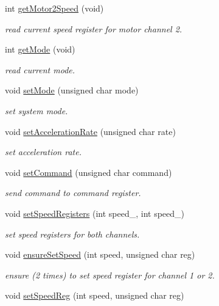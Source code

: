 \begin{DoxyCompactItemize}
int \hyperlink{classMd25_a2ff03a376f76d6e0132a722fe77acfb7}{get\+Motor2\+Speed} (void)
\begin{DoxyCompactList}\small\item\em read current speed register for motor channel 2. \end{DoxyCompactList}\item 
int \hyperlink{classMd25_a8bd5ce341e890968e63be0f8809d9f5b}{get\+Mode} (void)
\begin{DoxyCompactList}\small\item\em read current mode. \end{DoxyCompactList}\item 
void \hyperlink{classMd25_a4f1c692574af8ecc2b7a3d3a35a26d51}{set\+Mode} (unsigned char mode)
\begin{DoxyCompactList}\small\item\em set system mode. \end{DoxyCompactList}\item 
void \hyperlink{classMd25_a867fba5da9401423ee3dabfc18bbc1ed}{set\+Acceleration\+Rate} (unsigned char rate)
\begin{DoxyCompactList}\small\item\em set acceleration rate. \end{DoxyCompactList}\item 
void \hyperlink{classMd25_a470d70216b3a09da61e59a2074619ee2}{set\+Command} (unsigned char command)
\begin{DoxyCompactList}\small\item\em send command to command register. \end{DoxyCompactList}\item 
void \hyperlink{classMd25_a47d84a3612a8a59db1b48165eb143253}{set\+Speed\+Registers} (int speed\+\_, int speed\+\_)
\begin{DoxyCompactList}\small\item\em set speed registers for both channels. \end{DoxyCompactList}\item 
void \hyperlink{classMd25_a0b8767325de548ebb8b75bf6f9bbcd77}{ensure\+Set\+Speed} (int speed, unsigned char reg)
\begin{DoxyCompactList}\small\item\em ensure (2 times) to set speed register for channel 1 or 2. \end{DoxyCompactList}\item 
void \hyperlink{classMd25_a2f3b787d1ba19a791f9256898fca1413}{set\+Speed\+Reg} (int speed, unsigned char reg)

\end{DoxyCompactItemize}
